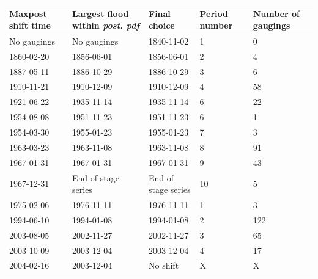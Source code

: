 \documentclass[11pt]{article}
\begin{document}
    \begin{center}
        \begin{table}[h!]
        \centering
            \begin{tabular}{|m{3cm}|m{3cm}|m{3cm}|m{2cm}|m{2cm}|}
                \firsthline
                \textbf{Maxpost shift time}  &  \textbf{Largest flood within \textit{post. pdf}} &  \textbf{Final choice} & \textbf{Period number} & \textbf{Number of gaugings}  \\
                \hline
                No gaugings     &      No gaugings   &   1840-11-02 & 1 & 0 \\
                \hline
                1860-02-20     &       1856-06-01  &   1856-06-01   & 2 & 4 \\
                \hline
                1887-05-11     &       1886-10-29  &   1886-10-29   & 3 & 6\\
                \hline
                1910-11-21     &       1910-12-09  &   1910-12-09  & 4 & 58 \\
                \hline
                1921-06-22     &       1935-11-14  &   1935-11-14   & 6 & 22 \\
                \hline
                1954-08-08    &       1951-11-23  &   1951-11-23   & 6 & 1\\
                \hline
                1954-03-30     &       1955-01-23  &   1955-01-23   & 7 & 3 \\
                \hline
                1963-03-23     &       1963-11-08  &   1963-11-08   & 8 & 91 \\
                \hline
                1967-01-31     &       1967-01-31  &   1967-01-31  & 9 & 43\\
                \hline
                1967-12-31      &       End of stage series & End of stage series & 10 & 5\\
                \hline
                \hline
                1975-02-06     &       1976-11-11  &   1976-11-11 & 1 & 3\\
                \hline
                1994-06-10     &       1994-01-08  &   1994-01-08   & 2 & 122 \\
                \hline
                2003-08-05     &       2002-11-27  &   2002-11-27  & 3 & 65 \\
                \hline
                2003-10-09     &       2003-12-04  &   2003-12-04   & 4 & 17 \\
                \hline
                2004-02-16     &       2003-12-04  &   No shift   & X & X \\

\end{tabular}
\end{table}
\end{center}
\end{document}
